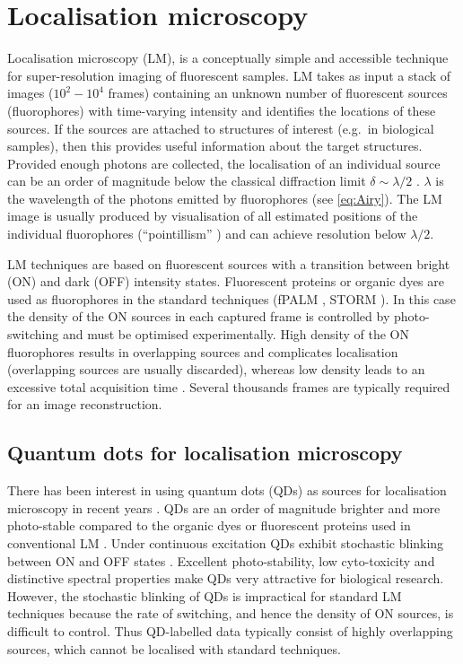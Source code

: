 
\section{Localisation microscopy\label{sec:LM}}

Localisation microscopy (LM), is a conceptually simple and accessible technique for super-resolution imaging of fluorescent samples. LM takes as input a stack of images ($10^2-10^4$ frames) containing an unknown number of fluorescent sources (fluorophores) with time-varying intensity and identifies the locations of these sources. If the sources are attached to structures of interest (e.g.\ in biological samples), then this provides useful information about the target structures. Provided enough photons are collected, the localisation of an individual source can be an order of magnitude below the classical diffraction limit $\delta \sim \lambda/2$ \cite{Ober2004}. $\lambda$ is the wavelength of the photons emitted by fluorophores (see \autoref{eq:Airy}). The LM image is usually produced by visualisation of all estimated positions of the individual fluorophores (``pointillism'' \cite{Lidke2005}) and can achieve resolution below $\lambda/2$. 

LM techniques are based on fluorescent sources with a transition between bright (ON) and dark (OFF) intensity states. Fluorescent proteins or organic dyes are used as fluorophores in the standard techniques (fPALM \cite{Hess2006}, STORM \cite{Rust2006}). In this case the density of the ON sources in each captured frame is controlled by photo-switching and must be optimised experimentally. High density of the ON fluorophores results in overlapping sources and complicates localisation (overlapping sources are usually discarded), whereas low density leads to an excessive total acquisition time \cite{Small2009}. Several thousands frames are typically required for an image reconstruction.


\subsection{Quantum dots for localisation microscopy\label{sec:QD for LM}}

There has been interest in using quantum dots (QDs) as sources for localisation microscopy in recent years \cite{Lidke2005,Lidke2007,Harrington2008,Simonson2011}. QDs are an order of magnitude brighter and more photo-stable compared to the organic dyes or fluorescent proteins used in conventional LM \cite{Resch-Genger2008}. Under continuous excitation QDs exhibit stochastic blinking between ON and OFF states \cite{Kuno2001,Stefani2009}. Excellent photo-stability, low cyto-toxicity and distinctive spectral properties make QDs very attractive for biological research. However, the stochastic blinking of QDs is impractical for standard LM techniques because the rate of switching, and hence the density of ON sources, is difficult to control. Thus QD-labelled data typically consist of highly overlapping sources, which cannot be localised with standard techniques.

